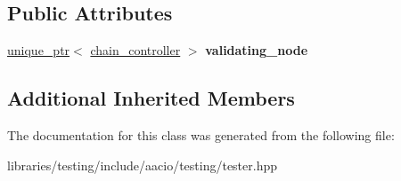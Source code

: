 \subsection*{Public Attributes}
\begin{DoxyCompactItemize}
\item 
\mbox{\label{classaacio_1_1testing_1_1validating__tester_af9eb093e33bf420b36676b990bb39ede}} 
\mbox{\hyperlink{classfc_1_1unique__ptr}{unique\+\_\+ptr}}$<$ \mbox{\hyperlink{classaacio_1_1chain_1_1chain__controller}{chain\+\_\+controller}} $>$ {\bfseries validating\+\_\+node}
\end{DoxyCompactItemize}
\subsection*{Additional Inherited Members}


The documentation for this class was generated from the following file\+:\begin{DoxyCompactItemize}
\item 
libraries/testing/include/aacio/testing/tester.\+hpp\end{DoxyCompactItemize}
